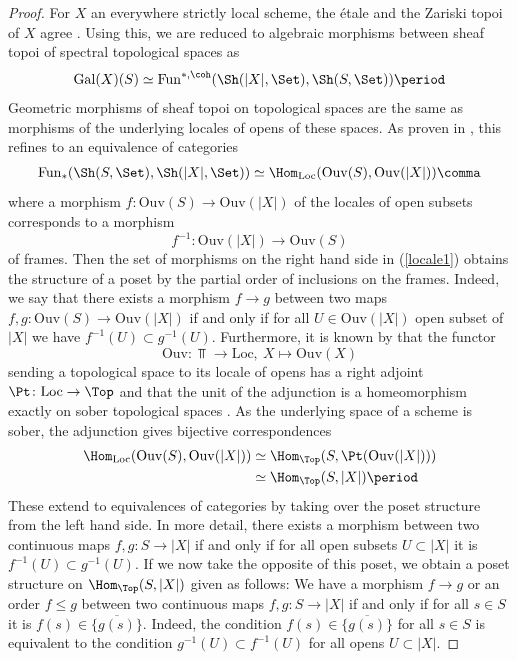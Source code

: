\documentclass[leqno]{article}
\renewcommand{\Fun}{\mathrm{Fun}}
\renewcommand{\Gal}{\mathrm{Gal}}
\begin{document}
\begin{proof}
For $X$ an everywhere strictly local scheme, the \'{e}tale and the Zariski topoi of $X$ agree \cite[Corollary 2.5]{MR3649361}.
Using this, we are reduced to algebraic morphisms between sheaf topoi of spectral topological spaces as 
$$\Gal(X)(S)\simeq\Fun^{*, \coh}(\Sh(|X|,\Set),\Sh(S,\Set))\period$$
Geometric morphisms of sheaf topoi on topological spaces are the same as morphisms of the underlying locales of opens of these spaces.
As proven in \cite[Proposition C.1.4.5]{MR1953060}, this refines to an equivalence of categories
\begin{align}\label{locale1}
\Fun_*(\Sh(S,\Set), \Sh(|X|,\Set))\simeq\Hom_{\mathrm{Loc}}(\mathrm{Ouv}(S), \mathrm{Ouv}(|X|))\comma
\end{align}
where a morphism $f\colon \mathrm{Ouv}(S) \rightarrow \mathrm{Ouv}(|X|)$ of the locales of open subsets corresponds to a morphism $$f^{-1}\colon \mathrm{Ouv}(|X|) \rightarrow \mathrm{Ouv}(S)$$ of frames. Then the set of morphisms on the right hand side in (\ref{locale1}) obtains the structure of a poset by the partial order of inclusions on the frames.
Indeed, we say that there exists a morphism $f \rightarrow g$ between two maps $f,g\colon \mathrm{Ouv}(S)\rightarrow \mathrm{Ouv}(|X|)$ if and only if for all $U\in  \mathrm{Ouv}(|X|)$ open subset of $|X|$ we have $f^{-1}(U)\subset g^{-1}(U)$.
Furthermore, it is known by \cite[Chapter IX, Section 3, Theorem 1]{MR1300636} that the functor $$\mathrm{Ouv}\colon \Top \rightarrow \mathrm{Loc}, \ X \mapsto \mathrm{Ouv}(X)$$ sending a topological space to its locale of opens has a right adjoint $\Pt\colon \mathrm{Loc}\rightarrow \Top$ and that the unit of the adjunction is a homeomorphism exactly on sober topological spaces \cite[Chapter IX, Section 3, Proposition 2]{MR1300636}.
As the underlying space of a scheme is sober, the adjunction gives bijective correspondences
\begin{align}\label{locale2}
\Hom_{\mathrm{Loc}}(\mathrm{Ouv}(S), \mathrm{Ouv}(|X|))&\simeq\Hom_{\Top}(S, \Pt(\mathrm{Ouv}(|X|))) \nonumber \\
&\simeq\Hom_{\Top}(S, |X|)\period
\end{align}
These extend to equivalences of categories by taking over the poset structure from the left hand side.
In more detail, there exists a morphism between two continuous maps $f, g\colon S\rightarrow |X|$ 
if and only if for all open subsets $U\subset |X|$ it is $f^{-1}(U) \subset g^{-1}(U)$. If we now take the opposite of this poset, we obtain a poset structure on $\Hom_{\Top}(S, |X|)$ given as follows: We have a morphism $f \rightarrow g$ or an order $f\leq g$ between two continuous maps $f, g\colon S\rightarrow |X|$ if and only if for all $s\in S$ it is $ f(s) \in \overline{\{g(s)\}} $. Indeed, the condition  $ f(s) \in \overline{\{g(s)\}} $ for all $s \in S$ is equivalent to the condition $g^{-1}(U) \subset f^{-1}(U)$ for all opens $U\subset |X|$.

\end{proof}
\end{document}

